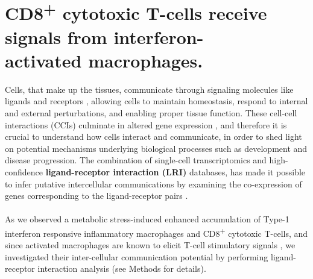 
\clearpage

\section{CD8\textsuperscript{+} cytotoxic T-cells receive signals from interferon-\\activated macrophages.}
\label{sec:cell_cell}

Cells, that make up the tissues, communicate through signaling molecules like ligands and receptors \textbf{\cite{armingol_deciphering_2021,armingol_diversification_2024}}, allowing cells to maintain homeostasis, respond to internal and external perturbations, and enabling proper tissue function. These cell-cell interactions (CCIs) culminate in altered gene expression \textbf{\cite{armingol_deciphering_2021,armingol_diversification_2024}}, and therefore it is crucial to understand how cells interact and communicate, in order to shed light on potential mechanisms underlying biological processes such as development and disease progression. The combination of single-cell transcriptomics and high-confidence \textbf{ligand-receptor interaction (LRI)} databases, has made it possible to infer putative intercellular communications by examining the co-expression of genes corresponding to the ligand-receptor pairs \textbf{\cite{wilk_comparative_2023}}.
\\\\
As we observed a metabolic stress-induced enhanced accumulation of Type-1 interferon responsive inflammatory macrophages and CD8\textsuperscript{+} cytotoxic T-cells, and since activated macrophages are known to elicit T-cell stimulatory signals \textbf{\cite{}}, we investigated their inter-cellular communication potential by performing ligand-receptor interaction analysis (see Methods for details).



